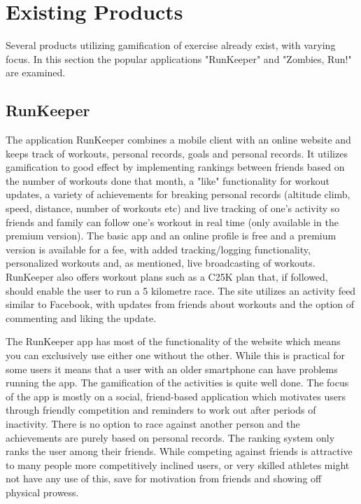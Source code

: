 \section{Existing Products}
Several products utilizing gamification of exercise already exist, with varying focus. In this section the popular applications "RunKeeper" and "Zombies, Run!" are examined. 

\subsection{RunKeeper}
The application RunKeeper combines a mobile client with an online website and keeps track of workouts, personal records, goals and personal records. It utilizes gamification to good effect by implementing rankings between friends based on the number of workouts done that month, a "like" functionality for workout updates, a variety of achievements for breaking personal records (altitude climb, speed, distance, number of workouts etc) and live tracking of one's activity so friends and family can follow one's workout in real time (only available in the premium version). The basic app and an online profile is free and a premium version is available for a fee, with added tracking/logging functionality, personalized workouts and, as mentioned, live broadcasting of workouts. RunKeeper also offers workout plans such as a \ac{C25K} plan that, if followed, should enable the user to run a 5 kilometre race. The site utilizes an activity feed similar to Facebook, with updates from friends about workouts and the option of commenting and liking the update. 
\vspace{10pt}

The RunKeeper app has most of the functionality of the website which means you can exclusively use either one without the other. While this is practical for some users it means that a user with an older smartphone can have problems running the app. The gamification of the activities is quite well done. The focus of the app is mostly on a social, friend-based application which motivates users through friendly competition and reminders to work out after periods of inactivity. There is no option to race against another person and the achievements are purely based on personal records. The ranking system only ranks the user among their friends. While competing against friends is attractive to many people more competitively inclined users, or very skilled athletes might not have any use of this, save for motivation from friends and showing off physical prowess.
\vspace{10pt}

